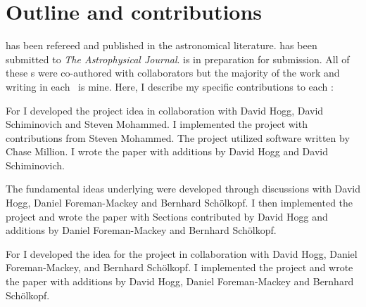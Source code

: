 \section{Outline and contributions}
 has been refereed and published in the astronomical literature.
 has been submitted to \emph{The Astrophysical Journal}.
 is in preparation for submission.
All of these \chapname s were co-authored with collaborators but the majority of the work and writing in each \chapname\ is mine.
Here, I describe my specific contributions to each \chapname:
\begin{enumerate}

{\item For   I developed the project idea in collaboration with David Hogg, David Schiminovich and Steven Mohammed.
I implemented the project with contributions from Steven Mohammed.
The project utilized software written by Chase Million.
I wrote the paper with additions by David Hogg and David Schiminovich.}

{\item The fundamental ideas underlying  were developed through discussions with David Hogg, Daniel Foreman-Mackey and Bernhard Sch\"olkopf.
I then implemented the project and wrote the paper with Sections contributed by David Hogg and additions by Daniel Foreman-Mackey and Bernhard Sch\"olkopf.}

{\item For  I developed the idea for the project in collaboration with David Hogg, Daniel Foreman-Mackey, and Bernhard Sch\"olkopf.
I implemented the project and wrote the paper with additions by David Hogg, Daniel Foreman-Mackey and Bernhard Sch\"olkopf.
}
\end{enumerate}
